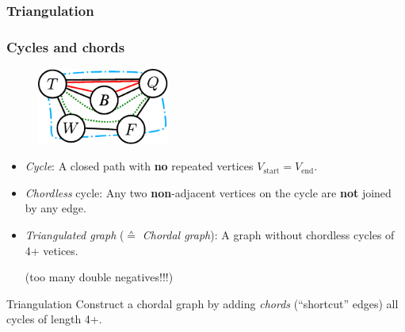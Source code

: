 \subsubsection{Triangulation}

\begin{frame}\frametitle{Cycles and chords}

\slidesonly{\vspace{-3mm}}

\begin{figure}[h]
\centering
	\includegraphics[height=2.5cm]{img/cycles2}
\end{figure}

\slidesonly{\vspace{-2mm}}

\begin{itemize}
\item \emph{Cycle}: A closed path with \textbf{no} repeated vertices  $V_{\text{start}}=V_{\text{end}}$.
\item \emph{Chordless} cycle: Any two \textbf{non}-adjacent vertices on the cycle are \textbf{not} joined by any edge.
\item \emph{Triangulated graph} ($\corresponds$ \emph{Chordal graph}): A graph without chordless cycles of 4+ vetices.
\begin{flushright}
{\footnotesize(too many double negatives!!!)}
\end{flushright}
\end{itemize}

\begin{block}{Triangulation}
Construct a chordal graph by adding \emph{chords} (``shortcut'' edges) all cycles of length 4+.
\end{block} 

\end{frame}


